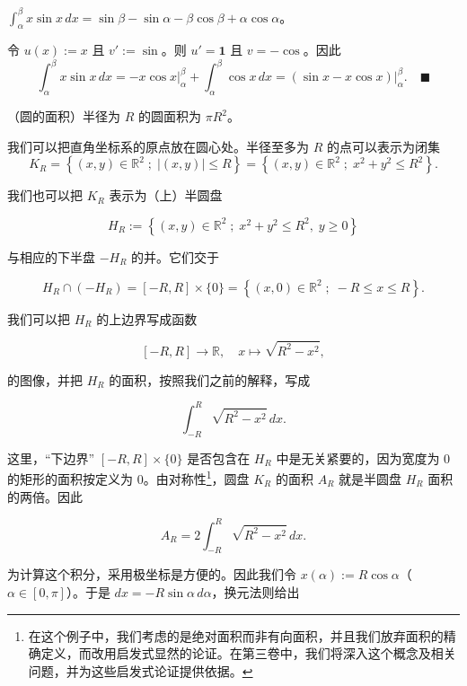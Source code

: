 \begin{example}

\begin{items}
\item

$ \int_{\alpha}^{\beta} x \sin x \, dx = \sin \beta - \sin \alpha - \beta \cos \beta + \alpha \cos \alpha $。

\proofhead
令 $ u(x) := x $ 且 $ v' := \sin $。则 $ u' = \mathbf{1} $ 且 $ v = -\cos $。因此
\[
\int_{\alpha}^{\beta} x \sin x \, dx = -x \cos x \big|_{\alpha}^{\beta} + \int_{\alpha}^{\beta} \cos x \, dx = (\sin x - x \cos x) \big|_{\alpha}^{\beta} .\quad\blacksquare
\]
\item

（圆的面积）半径为 $ R $ 的圆面积为 $ \pi R^2 $。

\proofhead
我们可以把直角坐标系的原点放在圆心处。半径至多为 $ R $ 的点可以表示为闭集
\[
K_R = \left\{ (x, y) \in \mathbb{R}^2 \; ; \; |(x, y)| \le R \right\} = \left\{ (x, y) \in \mathbb{R}^2 \; ; \; x^2 + y^2 \le R^2 \right\} .
\]

我们也可以把 $ K_R $ 表示为（上）半圆盘

\[
H_R := \left\{ (x, y) \in \mathbb{R}^2 \; ; \; x^2 + y^2 \le R^2 , \; y \ge 0 \right\}
\]

与相应的下半盘 $ -H_R $ 的并。它们交于

\[
H_R \cap (-H_R) = [-R, R] \times \{0\} = \left\{ (x, 0) \in \mathbb{R}^2 \; ; \; -R \le x \le R \right\} .
\]

我们可以把 $ H_R $ 的上边界写成函数

\[
[-R, R] \to \mathbb{R} , \quad x \mapsto \sqrt{R^2 - x^2} ,
\]

的图像，并把 $ H_R $ 的面积，按照我们之前的解释，写成

\[
\int_{-R}^{R} \sqrt{R^2 - x^2} \, dx .
\]
\end{items}


这里，“下边界” $ [-R, R] \times \{0\} $ 是否包含在 $ H_R $ 中是无关紧要的，因为宽度为 0 的矩形的面积按定义为 0。由对称性\footnote{在这个例子中，我们考虑的是绝对面积而非有向面积，并且我们放弃面积的精确定义，而改用启发式显然的论证。在第三卷中，我们将深入这个概念及相关问题，并为这些启发式论证提供依据。}，圆盘 $ K_R $ 的面积 $ A_R $ 就是半圆盘 $ H_R $ 面积的两倍。因此

\[
A_R = 2 \int_{-R}^{R} \sqrt{R^2 - x^2} \, dx .
\]

为计算这个积分，采用极坐标是方便的。因此我们令 $ x(\alpha) := R \cos \alpha $（$ \alpha \in [0, \pi] $）。于是 $ dx = -R \sin \alpha \, d\alpha $，换元法则给出


\end{example}
